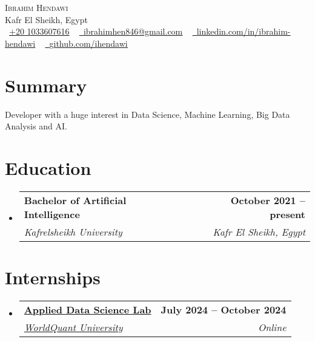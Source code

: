 \documentclass[letterpaper,11pt]{article}
\makeatletter
\newcommand{\resumeSubheading}[4]{
  \vspace{-2pt}\item
    \begin{tabular*}{1.0\textwidth}[t]{l@{\extracolsep{\fill}}r}
      \textbf{#1} & \textbf{\small #2} \\
      \textit{\small#3} & \textit{\small #4} \\
    \end{tabular*}\vspace{-7pt}
}
\newcommand{\resumeSubHeadingListStart}{\begin{itemize}[leftmargin=0.0in, label={}]}
\newcommand{\resumeSubHeadingListEnd}{\end{itemize}}
\makeatother
\begin{document}
\begin{center}


  {\Huge \scshape Ibrahim Hendawi} \\ \vspace{1pt}
  Kafr El Sheikh, Egypt \\ \vspace{1pt}
  \small
  {\raisebox{-0.1\height}
  \faPhone\ 
  \underline{+20 1033607616}} ~ 
  \href{mialto:ibrahimhen846@gmail.com}
  {\raisebox{-0.2\height}
  \faEnvelope\
  \underline{ibrahimhen846@gmail.com}} ~
  \href{https://www.linkedin.com/in/ibrahim-hendawi-7a5655217/}
  {\raisebox{-0.2\height}
  \faLinkedin\ 
  \underline{linkedin.com/in/ibrahim-hendawi}}  ~
  \href{https://github.com/ihendawi}
  {\raisebox{-0.2\height}
  \faGithub\ 
  \underline{github.com/ihendawi}}
  \vspace{-8pt}


\end{center}


\section{Summary}
Developer with a huge interest in Data Science, Machine Learning, Big Data Analysis and AI.


\section{Education}
  \resumeSubHeadingListStart
    \resumeSubheading
      {Bachelor of Artificial Intelligence}{October 2021 -- present}
      {Kafrelsheikh University}{Kafr El Sheikh, Egypt}
  \resumeSubHeadingListEnd

  
  \vspace{-13pt}


\section{Internships}
  \resumeSubHeadingListStart
    \resumeSubheading
      {\href{https://www.credly.com/badges/53dc8e8f-64e7-4081-8d7c-0b149df635aa}{Applied Data Science Lab}}{July 2024 -- October 2024}
      {\href{https://www.credly.com/organizations/wqu/badges}{WorldQuant University}}{Online}
  \resumeSubHeadingListEnd
  \vspace{-10pt}
  
\end{document}
